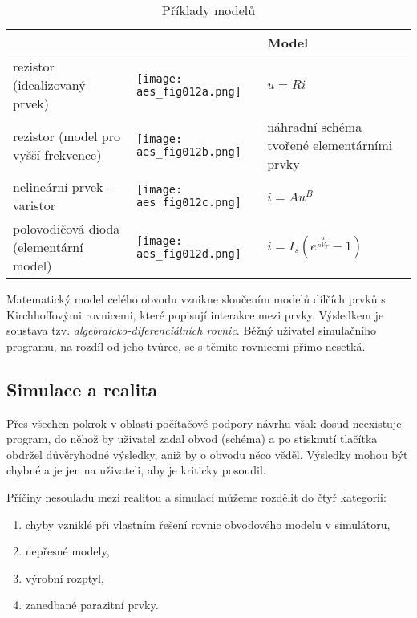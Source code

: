           \begin{table*}
            \centering
            \begin{tabular}{|p{4cm}|p{4cm}|p{3cm}|}
              \hline
              \rowcolor{CornflowerBlue}{typ}                                & { } & {Model}   \\
              \hline
              rezistor (idealizovaný prvek)             
                & \texttt{[image: aes\_fig012a.png]}      & \(u = Ri\)      \\
              \hline
              rezistor (model pro vyšší frekvence)      
                & \texttt{[image: aes\_fig012b.png]}      
                & náhradní schéma tvořené elementárními prvky \\ 
              \hline    
              nelineární prvek - varistor               
                & \texttt{[image: aes\_fig012c.png]}      & \(i = Au^B\)    \\
              \hline
              polovodičová dioda (elementární model)    
                & \texttt{[image: aes\_fig012d.png]} 
                &  \(i = I_s\left(e^\frac{u}{nV_T}-1\right)\)  \\
              \hline 
            \end{tabular}
            \caption{Příklady modelů}\label{aes:tab001}
          \end{table*}

          Matematický model celého obvodu vznikne sloučením modelů dílčích prvků s Kirchhoffovými
          rovnicemi, které popisují interakce mezi prvky. Výsledkem je soustava tzv.
          \emph{algebraicko-diferenciálních rovnic}. Běžný uživatel simulačního programu, na rozdíl od
          jeho tvůrce, se s těmito rovnicemi přímo nesetká.

      \subsection{Simulace a realita}
        Přes všechen pokrok v oblasti počítačové podpory návrhu však dosud neexistuje program, do
        něhož by uživatel zadal obvod (schéma) a po stisknutí tlačítka obdržel důvěryhodné výsledky,
        aniž by o obvodu něco věděl. Výsledky mohou být chybné a je jen na uživateli, aby je kriticky
        posoudil. 
        
        Příčiny nesouladu mezi realitou a simulací můžeme rozdělit do čtyř kategorii:
        \begin{enumerate}[leftmargin=2cm,rightmargin=0.8cm, label=\emph{\alph*}),noitemsep]
          \item chyby vzniklé při vlastním řešení rovnic obvodového modelu v simulátoru, 
          \item nepřesné modely,
          \item výrobní rozptyl, 
          \item zanedbané parazitní prvky.
        \end{enumerate}

